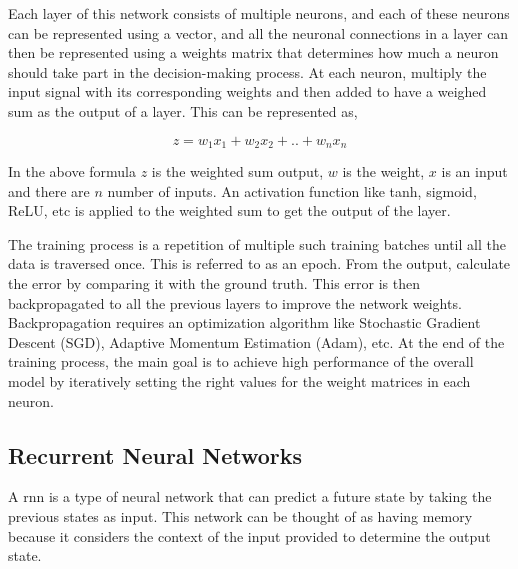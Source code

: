 Each layer of this network consists of multiple neurons, and each of these neurons can be represented using a vector, and all the neuronal connections in a layer can then be represented using a weights matrix that determines how much a neuron should take part in the decision-making process. At each neuron, multiply the input signal with its corresponding weights and then added to have a weighed sum as the output of a layer. This can be represented as,

\[ z = w_1x_1 + w_2x_2 + .. + w_nx_n \]

In the above formula $z$ is the weighted sum output, $w$ is the weight, $x$ is an input and there are $n$ number of inputs. An activation function like tanh, sigmoid, ReLU, etc is applied to the weighted sum to get the output of the layer. 

The training process is a repetition of multiple such training batches until all the data is traversed once. This is referred to as an epoch. From the output, calculate the error by comparing it with the ground truth. This error is then backpropagated to all the previous layers to improve the network weights. Backpropagation requires an optimization algorithm like Stochastic Gradient Descent (SGD), Adaptive Momentum Estimation (Adam), etc. At the end of the training process, the main goal is to achieve high performance of the overall model by iteratively setting the right values for the weight matrices in each neuron.

\subsection {Recurrent Neural Networks}
A \acrfull{rnn} is a type of neural network that can predict a future state by taking the previous states as input. \cite{Graves2013SpeechNetworks} This network can be thought of as having memory because it considers the context of the input provided to determine the output state. \cite{Hagner2017RecurrentModel}


